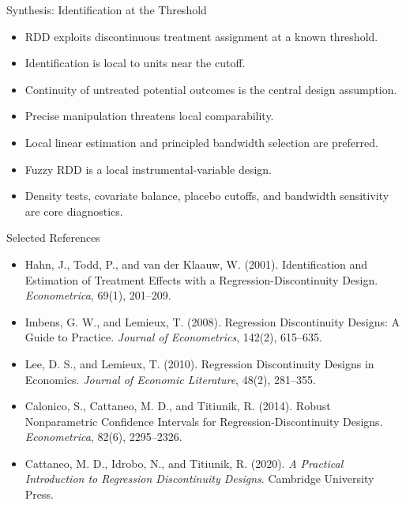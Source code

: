 \documentclass[aspectratio=169,11pt]{beamer}
\begin{document}
\begin{frame}{Synthesis: Identification at the Threshold}
\begin{itemize}
\item RDD exploits discontinuous treatment assignment at a known threshold.
\item Identification is local to units near the cutoff.
\item Continuity of untreated potential outcomes is the central design assumption.
\item Precise manipulation threatens local comparability.
\item Local linear estimation and principled bandwidth selection are preferred.
\item Fuzzy RDD is a local instrumental-variable design.
\item Density tests, covariate balance, placebo cutoffs, and bandwidth sensitivity are core diagnostics.
\end{itemize}
\end{frame}

\begin{frame}{Selected References}
\small
\begin{itemize}
\item Hahn, J., Todd, P., and van der Klaauw, W. (2001). Identification and Estimation of Treatment Effects with a Regression-Discontinuity Design. \textit{Econometrica}, 69(1), 201--209.
\item Imbens, G. W., and Lemieux, T. (2008). Regression Discontinuity Designs: A Guide to Practice. \textit{Journal of Econometrics}, 142(2), 615--635.
\item Lee, D. S., and Lemieux, T. (2010). Regression Discontinuity Designs in Economics. \textit{Journal of Economic Literature}, 48(2), 281--355.
\item Calonico, S., Cattaneo, M. D., and Titiunik, R. (2014). Robust Nonparametric Confidence Intervals for Regression-Discontinuity Designs. \textit{Econometrica}, 82(6), 2295--2326.
\item Cattaneo, M. D., Idrobo, N., and Titiunik, R. (2020). \textit{A Practical Introduction to Regression Discontinuity Designs}. Cambridge University Press.
\end{itemize}
\end{frame}

\contactslide
\end{document}
